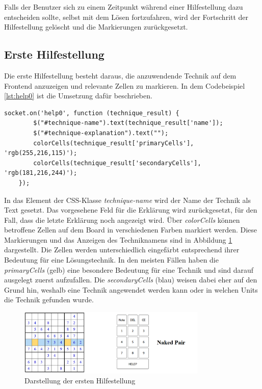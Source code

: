 Falls der Benutzer sich zu einem Zeitpunkt während einer Hilfestellung dazu entscheiden sollte, selbst mit dem Lösen fortzufahren, wird der Fortschritt der Hilfestellung gelöscht und die Markierungen zurückgesetzt.

\subsection{Erste Hilfestellung}

Die erste Hilfestellung besteht daraus, die anzuwendende Technik auf dem Frontend anzuzeigen und relevante Zellen zu markieren.  In dem Codebeispiel \ref{lst:help0} ist die Umsetzung dafür beschrieben.

\begin{lstlisting}[caption={Erste Hilfestellung}, label={lst:help0}]
	socket.on('help0', function (technique_result) {
		$("#technique-name").text(technique_result['name']);
		$("#technique-explanation").text("");
		colorCells(technique_result['primaryCells'], 'rgb(255,216,115)');
		colorCells(technique_result['secondaryCells'], 'rgb(181,216,244)');
	});
\end{lstlisting}

In das Element der CSS-Klasse \textit{technique-name} wird der Name der Technik als Text gesetzt. Das vorgesehene Feld für die Erklärung wird zurückgesetzt, für den Fall, dass die letzte Erklärung noch angezeigt wird. Über \textit{colorCells} können betroffene Zellen auf dem Board in verschiedenen Farben markiert werden. Diese Markierungen und das Anzeigen des Techniknamens sind in Abbildung \ref{fig:Help1} dargestellt. Die Zellen werden unterschiedlich eingefärbt entsprechend ihrer Bedeutung für eine Lösungstechnik. In den meisten Fällen haben die \textit{primaryCells} (gelb) eine besondere Bedeutung für eine Technik und sind darauf ausgelegt zuerst aufzufallen. Die \textit{secondaryCells} (blau) weisen dabei eher auf den Grund hin, weshalb eine Technik angewendet werden kann oder in welchen Units die Technik gefunden wurde.

\begin{figure}[H]
	\centering
	\includegraphics[width=0.8\textwidth]{images/Help1.png}
	\caption{Darstellung der ersten Hilfestellung}
	\label{fig:Help1}
\end{figure}

